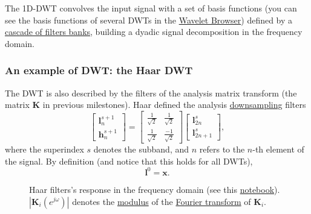 The 1D-DWT convolves the input signal with a set of basis functions
(you can see the basis functions of several DWTs in the
\href{http://wavelets.pybytes.com/}{Wavelet Browser}) defined by a
\href{https://tecnologias-multimedia.github.io/milestones/12-temporal_coding/}{cascade
  of filters banks}, building a dyadic signal decomposition in the
frequency domain.

\subsubsection{An example of DWT: the Haar DWT}
The DWT is also described by the filters of
the analysis matrix transform (the matrix ${\mathbf K}$ in previous
  milestones). Haar defined the analysis
\href{https://en.wikipedia.org/wiki/Downsampling_(signal_processing)}{downsampling}
filters
\begin{equation}
  \begin{bmatrix}
    {\mathbf l}^{s+1}_n \\
    {\mathbf h}^{s+1}_n
  \end{bmatrix}
  = 
  \begin{bmatrix} \frac{1}{\sqrt{2}} & \frac{1}{\sqrt{2}} \\ \frac{1}{\sqrt{2}} & \frac{-1}{\sqrt{2}} \end{bmatrix}
  \begin{bmatrix}
    {\mathbf l}^s_{2n} \\
    {\mathbf l}^s_{2n+1}
  \end{bmatrix},
  \label{eq:Haar_transform}
\end{equation}
where the superindex $s$ denotes the subband, and $n$ refers to the
$n$-th element of the signal. By definition (and notice that this
holds for all DWTs),
\begin{equation}
  {\mathbf l}^0={\mathbf x}.
\end{equation}

\begin{figure}
  \centering
  \caption{Haar filters's response in the frequency domain (see this
    \href{https://github.com/Sistemas-Multimedia/Sistemas-Multimedia.github.io/blob/master/milestones/08-DWT/DWT_filters_analysis.ipynb}{notebook}).
    $|{\mathbf K}_i(e^{j\omega})|$ denotes the
    \href{https://en.wikipedia.org/wiki/Absolute_value}{modulus} of
    the \href{https://en.wikipedia.org/wiki/Fourier_transform}{Fourier
      transform} of ${\mathbf K}_i$.}
  \label{fig:Haar_modulus}
\end{figure}


